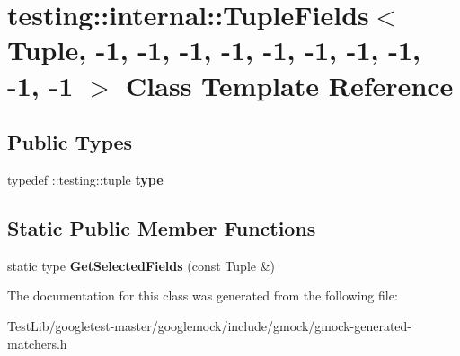 \hypertarget{classtesting_1_1internal_1_1TupleFields_3_01Tuple_00_01-1_00_01-1_00_01-1_00_01-1_00_01-1_00_01-e023d39d312048e71832a898e9e07f70}{}\section{testing\+:\+:internal\+:\+:Tuple\+Fields$<$ Tuple, -\/1, -\/1, -\/1, -\/1, -\/1, -\/1, -\/1, -\/1, -\/1, -\/1 $>$ Class Template Reference}
\label{classtesting_1_1internal_1_1TupleFields_3_01Tuple_00_01-1_00_01-1_00_01-1_00_01-1_00_01-1_00_01-e023d39d312048e71832a898e9e07f70}
\subsection*{Public Types}
\begin{DoxyCompactItemize}
\item 
\mbox{\label{classtesting_1_1internal_1_1TupleFields_3_01Tuple_00_01-1_00_01-1_00_01-1_00_01-1_00_01-1_00_01-e023d39d312048e71832a898e9e07f70_a853fa65a18c6b392327ae2cf59bc9571}} 
typedef \+::testing\+::tuple {\bfseries type}
\end{DoxyCompactItemize}
\subsection*{Static Public Member Functions}
\begin{DoxyCompactItemize}
\item 
\mbox{\label{classtesting_1_1internal_1_1TupleFields_3_01Tuple_00_01-1_00_01-1_00_01-1_00_01-1_00_01-1_00_01-e023d39d312048e71832a898e9e07f70_a50c35eab642d04560d5a412cd10246ce}} 
static type {\bfseries Get\+Selected\+Fields} (const Tuple \&)
\end{DoxyCompactItemize}


The documentation for this class was generated from the following file\+:\begin{DoxyCompactItemize}
\item 
Test\+Lib/googletest-\/master/googlemock/include/gmock/gmock-\/generated-\/matchers.\+h\end{DoxyCompactItemize}
